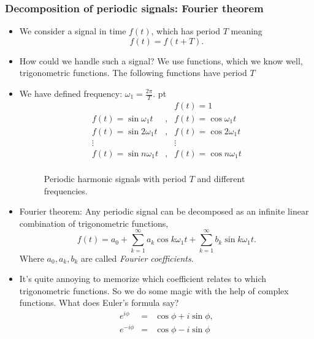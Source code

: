 \documentclass[t,aspectratio=169]{beamer}
\begin{document}
\begin{frame}
\frametitle{Decomposition of periodic signals: Fourier theorem}
\begin{itemize}
\item We consider a signal in time $f(t)$, which has period $T$ meaning
$$f(t)=f(t+T).$$
\item How could we handle such a signal? We use functions, which we know well, trigonometric functions. The following functions have period $T$
\item We have defined frequency: $\omega_{1}=\frac{2\pi}{T}$.
 pt
\begin{eqnarray*}
      & & f(t)=1 \\
    f(t)=\sin\omega_{1}t&,&  f(t)=\cos\omega_{1}t \\
    f(t)=\sin2\omega_{1}t&,&  f(t)=\cos2\omega_{1}t \\
    \vdots && \vdots  \\
    f(t)=\sin n\omega_{1}t&,&  f(t)=\cos n\omega_{1}t \\
\end{eqnarray*}

\pagebreak
\begin{center}
\begin{figure}
\caption{Periodic harmonic signals with period $T$ and different frequencies.}
\end{figure}
\end{center}

\pagebreak
\item Fourier theorem: Any periodic signal can be decomposed as an infinite linear combination of trigonometric functions,
$$f(t)=a_{0}+\sum\limits_{k=1}^{\infty}a_{k}\cos k\omega_{1}t+\sum\limits_{k=1}^{\infty}b_{k}\sin k\omega_{1}t.$$
Where $a_{0},a_{k},b_{k}$ are called \emph{Fourier coefficients}.
\item It's quite annoying to memorize which coefficient relates to which trigonometric functions. So we do some magic with the help of complex functions. What does Euler's formula say?
\begin{eqnarray*}
e^{i\phi}&=&\cos\phi+i\sin\phi, \\
e^{-i\phi}&=&\cos\phi-i\sin\phi \\
\end{eqnarray*}


\end{itemize}
\end{frame}
\end{document}
